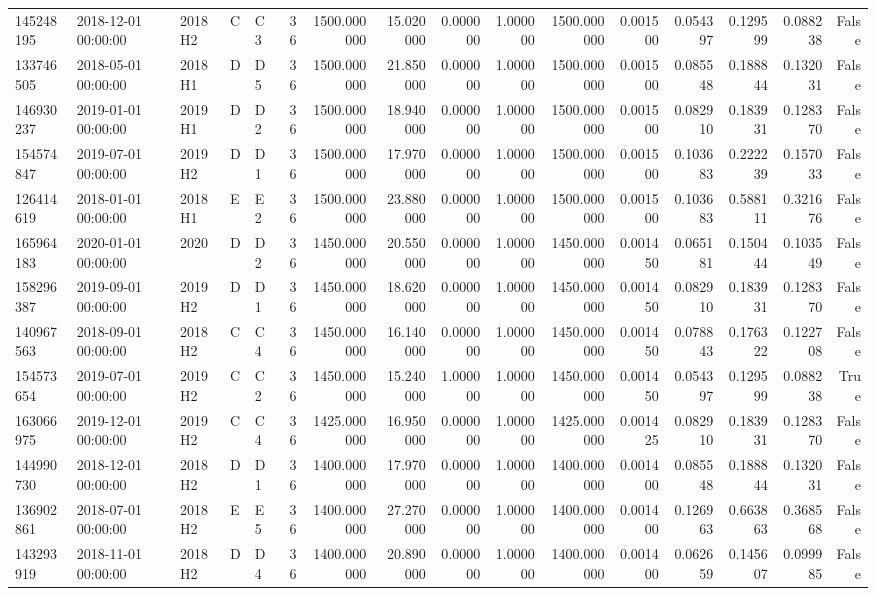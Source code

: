 \begin{tabular}{lllllrrrrrrrrrrr}
145248195 & 2018-12-01 00:00:00 & 2018H2 & C & C3 & 36 & 1500.000000 & 15.020000 & 0.000000 & 1.000000 & 1500.000000 & 0.001500 & 0.054397 & 0.129599 & 0.088238 & False \\
133746505 & 2018-05-01 00:00:00 & 2018H1 & D & D5 & 36 & 1500.000000 & 21.850000 & 0.000000 & 1.000000 & 1500.000000 & 0.001500 & 0.085548 & 0.188844 & 0.132031 & False \\
146930237 & 2019-01-01 00:00:00 & 2019H1 & D & D2 & 36 & 1500.000000 & 18.940000 & 0.000000 & 1.000000 & 1500.000000 & 0.001500 & 0.082910 & 0.183931 & 0.128370 & False \\
154574847 & 2019-07-01 00:00:00 & 2019H2 & D & D1 & 36 & 1500.000000 & 17.970000 & 0.000000 & 1.000000 & 1500.000000 & 0.001500 & 0.103683 & 0.222239 & 0.157033 & False \\
126414619 & 2018-01-01 00:00:00 & 2018H1 & E & E2 & 36 & 1500.000000 & 23.880000 & 0.000000 & 1.000000 & 1500.000000 & 0.001500 & 0.103683 & 0.588111 & 0.321676 & False \\
165964183 & 2020-01-01 00:00:00 & 2020 & D & D2 & 36 & 1450.000000 & 20.550000 & 0.000000 & 1.000000 & 1450.000000 & 0.001450 & 0.065181 & 0.150444 & 0.103549 & False \\
158296387 & 2019-09-01 00:00:00 & 2019H2 & D & D1 & 36 & 1450.000000 & 18.620000 & 0.000000 & 1.000000 & 1450.000000 & 0.001450 & 0.082910 & 0.183931 & 0.128370 & False \\
140967563 & 2018-09-01 00:00:00 & 2018H2 & C & C4 & 36 & 1450.000000 & 16.140000 & 0.000000 & 1.000000 & 1450.000000 & 0.001450 & 0.078843 & 0.176322 & 0.122708 & False \\
154573654 & 2019-07-01 00:00:00 & 2019H2 & C & C2 & 36 & 1450.000000 & 15.240000 & 1.000000 & 1.000000 & 1450.000000 & 0.001450 & 0.054397 & 0.129599 & 0.088238 & True \\
163066975 & 2019-12-01 00:00:00 & 2019H2 & C & C4 & 36 & 1425.000000 & 16.950000 & 0.000000 & 1.000000 & 1425.000000 & 0.001425 & 0.082910 & 0.183931 & 0.128370 & False \\
144990730 & 2018-12-01 00:00:00 & 2018H2 & D & D1 & 36 & 1400.000000 & 17.970000 & 0.000000 & 1.000000 & 1400.000000 & 0.001400 & 0.085548 & 0.188844 & 0.132031 & False \\
136902861 & 2018-07-01 00:00:00 & 2018H2 & E & E5 & 36 & 1400.000000 & 27.270000 & 0.000000 & 1.000000 & 1400.000000 & 0.001400 & 0.126963 & 0.663863 & 0.368568 & False \\
143293919 & 2018-11-01 00:00:00 & 2018H2 & D & D4 & 36 & 1400.000000 & 20.890000 & 0.000000 & 1.000000 & 1400.000000 & 0.001400 & 0.062659 & 0.145607 & 0.099985 & False \\

\end{tabular}
